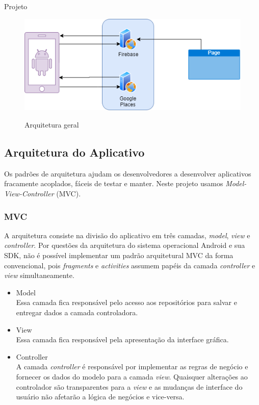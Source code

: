 \documentclass[
	12pt,				%
	openany,			%
	twoside,			%
	a4paper,			%
	english,			%
	french,				%
	spanish,			%
	brazil				%
	]{abntex2}
\begin{document}
\begin{chapter}{Projeto}
\begin{figure}[h]
\centering
   \caption{Arquitetura geral}
   \includegraphics[scale=0.85]{media/arquitetura_app.png}
     \label{fig:arquitetura_geral}
\end{figure}

\subsection{Arquitetura do Aplicativo}
Os padrões de arquitetura ajudam os desenvolvedores a desenvolver aplicativos fracamente acoplados, fáceis de testar e manter.
Neste projeto usamos \textit{Model-View-Controller} (MVC).

\subsubsection{MVC}
A arquitetura  consiste na divisão do aplicativo em três camadas,  \textit{model}, \textit{view} e \textit{controller}. Por questões da arquitetura do sistema operacional Android e sua SDK, não é possível implementar um padrão arquitetural MVC da forma convencional, pois \textit{fragments} e \textit{activities} assumem papéis da camada \textit{controller} e \textit{view} simultaneamente.

\begin{itemize}
  \item{Model}\\ Essa camada fica responsável pelo acesso aos repositórios para salvar e entregar dados a camada controladora.
     \item{View}\\ Essa camada fica responsável pela apresentação da interface gráfica.
       \item{Controller}\\ A camada \textit{controller} é responsável por implementar as regras de negócio e fornecer os dados do modelo para a camada \textit{view}. Quaisquer alterações ao controlador são transparentes para a \textit{view} e as mudanças de interface do usuário não afetarão a lógica de negócios e vice-versa.
\end{itemize}


\end{chapter}
\end{document}
